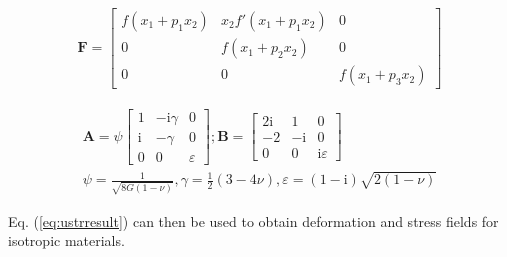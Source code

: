 \documentclass[%
reprint,
 amsmath,amssymb,
 aps,
 prb,
]{revtex4-1}
\newcommand*{\rtten}[1]{\mathbf{\boldsymbol{#1}}}
\begin{document}
\begin{eqnarray*}
\rtten{F}=\begin{bmatrix}f(x_1+p_1x_2) & x_2 f'(x_1+p_1x_2) & 0\\
0 & f(x_1+p_2x_2) & 0\\
0 & 0 & f(x_1+p_3x_2)
\end{bmatrix}
\end{eqnarray*}

\begin{eqnarray*}
\rtten{A}=\psi \begin{bmatrix}1 & -\text{i}\gamma & 0\\
\text{i} & -\gamma & 0\\
0 & 0 & \varepsilon
\end{bmatrix};
\rtten{B}=\begin{bmatrix}2\text{i} & 1 & 0\\
-2 & -\text{i} & 0\\
0 & 0 & \text{i}\varepsilon
\end{bmatrix}\\
\psi=\frac{1}{\sqrt{8G(1-\nu)}}, \gamma=\frac{1}{2}(3-4\nu), \varepsilon= (1-\text{i})\sqrt{2(1-\nu)}
\end{eqnarray*}

Eq. (\ref{eq:ustrresult}) can then be used to obtain deformation and stress fields for isotropic materials.
\end{document}
